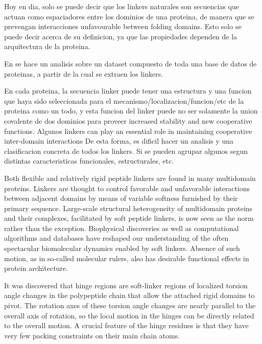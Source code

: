 Hoy en dia, solo se puede decir que los linkers naturales son secuencias que actuan como espaciadores entre los dominios de una proteina, de manera que se prevengan interacciones unfavourable between folding domains. 
Esto solo se puede decir acerca de su definicion, ya que las propiedades dependen de la arquitectura de la proteina.

En \cite{george2002analysis} se hace un analisis sobre un dataset compuesto de toda una base de datos de proteinas, a partir de la cual se extraen los linkers.


En cada proteina, la secuencia linker puede tener una estructura y una funcion que haya sido seleccionada para el mecanismo/localizacion/funcion/etc de la proteina como un todo, y esta funcion del linker puede no ser solamente la union covalente de dos dominios para proveer increased stability and new cooperative functions.
Algunos linkers can play an essential role in maintaining cooperative inter-domain interactions
De esta forma, es dificil hacer un analisis y una clasificacion concreta de todos los linkers. Si se pueden agrupar algunos segun distintas caracteristicas funcionales, estructurales, etc.



Both flexible and relatively rigid peptide linkers are found in many multidomain proteins. 
Linkers are thought to control favorable and unfavorable interactions between adjacent domains by means of variable softness
furnished by their primary sequence. Large-scale structural heterogeneity of multidomain proteins
and their complexes, facilitated by soft peptide linkers, is now seen as the norm rather than the
exception. Biophysical discoveries as well as computational algorithms and databases have
reshaped our understanding of the often spectacular biomolecular dynamics enabled by soft linkers.
Absence of such motion, as in so-called molecular rulers, also has desirable functional effects in
protein architecture.


It was discovered that hinge regions are
soft-linker regions of localized torsion angle changes in
the polypeptide chain that allow the attached rigid
domains to pivot. The rotation axes of these torsion
angle changes are nearly parallel to the overall axis of
rotation, so the local motion in the hinges can be
directly related to the overall motion. A crucial feature
of the hinge residues is that they have very few packing
constraints on their main chain atoms.

